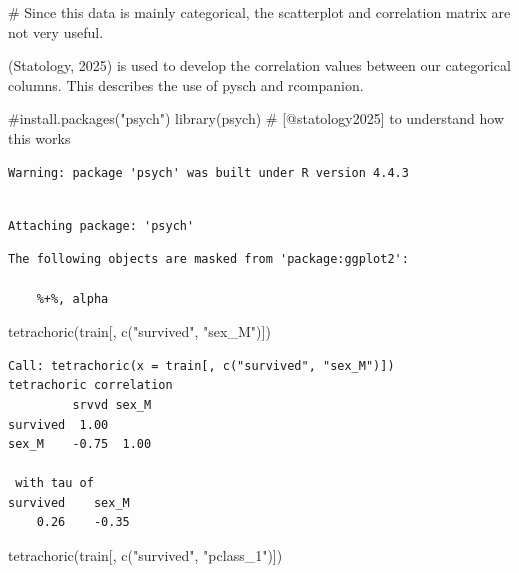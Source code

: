 \documentclass[
  letterpaper,
  DIV=11,
  numbers=noendperiod]{scrartcl}
\newenvironment{Shaded}{\begin{snugshade}}{\end{snugshade}}
\newcommand{\CommentTok}[1]{\textcolor[rgb]{0.37,0.37,0.37}{#1}}
\newcommand{\FunctionTok}[1]{\textcolor[rgb]{0.28,0.35,0.67}{#1}}
\newcommand{\NormalTok}[1]{\textcolor[rgb]{0.00,0.23,0.31}{#1}}
\newcommand{\StringTok}[1]{\textcolor[rgb]{0.13,0.47,0.30}{#1}}
\begin{document}
\begin{Shaded}
\begin{Highlighting}[]
\CommentTok{\# Since this data is mainly categorical, the scatterplot and correlation matrix are not very useful.}
\end{Highlighting}
\end{Shaded}

(Statology, 2025) is used to develop the correlation values between our
categorical columns. This describes the use of pysch and rcompanion.

\begin{Shaded}
\begin{Highlighting}[]
\CommentTok{\#install.packages("psych")}
\FunctionTok{library}\NormalTok{(psych) }\CommentTok{\# [@statology2025] to understand how this works}
\end{Highlighting}
\end{Shaded}

\begin{verbatim}
Warning: package 'psych' was built under R version 4.4.3
\end{verbatim}

\begin{verbatim}

Attaching package: 'psych'
\end{verbatim}

\begin{verbatim}
The following objects are masked from 'package:ggplot2':

    %+%, alpha
\end{verbatim}

\begin{Shaded}
\begin{Highlighting}[]
\FunctionTok{tetrachoric}\NormalTok{(train[, }\FunctionTok{c}\NormalTok{(}\StringTok{"survived"}\NormalTok{, }\StringTok{"sex\_M"}\NormalTok{)])}
\end{Highlighting}
\end{Shaded}

\begin{verbatim}
Call: tetrachoric(x = train[, c("survived", "sex_M")])
tetrachoric correlation 
         srvvd sex_M
survived  1.00      
sex_M    -0.75  1.00

 with tau of 
survived    sex_M 
    0.26    -0.35 
\end{verbatim}

\begin{Shaded}
\begin{Highlighting}[]
\FunctionTok{tetrachoric}\NormalTok{(train[, }\FunctionTok{c}\NormalTok{(}\StringTok{"survived"}\NormalTok{, }\StringTok{"pclass\_1"}\NormalTok{)])}
\end{Highlighting}
\end{Shaded}
\end{document}
